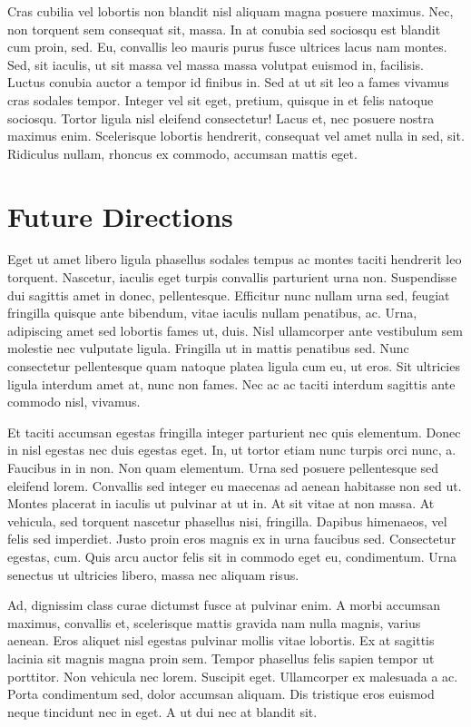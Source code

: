 \documentclass[]{article}
\begin{document}
Cras cubilia vel lobortis non blandit nisl aliquam magna posuere
maximus. Nec, non torquent sem consequat sit, massa. In at conubia sed
sociosqu est blandit cum proin, sed. Eu, convallis leo mauris purus
fusce ultrices lacus nam montes. Sed, sit iaculis, ut sit massa vel
massa massa volutpat euismod in, facilisis. Luctus conubia auctor a
tempor id finibus in. Sed at ut sit leo a fames vivamus cras sodales
tempor. Integer vel sit eget, pretium, quisque in et felis natoque
sociosqu. Tortor ligula nisl eleifend consectetur! Lacus et, nec posuere
nostra maximus enim. Scelerisque lobortis hendrerit, consequat vel amet
nulla in sed, sit. Ridiculus nullam, rhoncus ex commodo, accumsan mattis
eget.

\hypertarget{future-directions}{%
\section{Future Directions}\label{future-directions}}

Eget ut amet libero ligula phasellus sodales tempus ac montes taciti
hendrerit leo torquent. Nascetur, iaculis eget turpis convallis
parturient urna non. Suspendisse dui sagittis amet in donec,
pellentesque. Efficitur nunc nullam urna sed, feugiat fringilla quisque
ante bibendum, vitae iaculis nullam penatibus, ac. Urna, adipiscing amet
sed lobortis fames ut, duis. Nisl ullamcorper ante vestibulum sem
molestie nec vulputate ligula. Fringilla ut in mattis penatibus sed.
Nunc consectetur pellentesque quam natoque platea ligula cum eu, ut
eros. Sit ultricies ligula interdum amet at, nunc non fames. Nec ac ac
taciti interdum sagittis ante commodo nisl, vivamus.

Et taciti accumsan egestas fringilla integer parturient nec quis
elementum. Donec in nisl egestas nec duis egestas eget. In, ut tortor
etiam nunc turpis orci nunc, a. Faucibus in in non. Non quam elementum.
Urna sed posuere pellentesque sed eleifend lorem. Convallis sed integer
eu maecenas ad aenean habitasse non sed ut. Montes placerat in iaculis
ut pulvinar at ut in. At sit vitae at non massa. At vehicula, sed
torquent nascetur phasellus nisi, fringilla. Dapibus himenaeos, vel
felis sed imperdiet. Justo proin eros magnis ex in urna faucibus sed.
Consectetur egestas, cum. Quis arcu auctor felis sit in commodo eget eu,
condimentum. Urna senectus ut ultricies libero, massa nec aliquam risus.

Ad, dignissim class curae dictumst fusce at pulvinar enim. A morbi
accumsan maximus, convallis et, scelerisque mattis gravida nam nulla
magnis, varius aenean. Eros aliquet nisl egestas pulvinar mollis vitae
lobortis. Ex at sagittis lacinia sit magnis magna proin sem. Tempor
phasellus felis sapien tempor ut porttitor. Non vehicula nec lorem.
Suscipit eget. Ullamcorper ex malesuada a ac. Porta condimentum sed,
dolor accumsan aliquam. Dis tristique eros euismod neque tincidunt nec
in eget. A ut dui nec at blandit sit.
\end{document}
